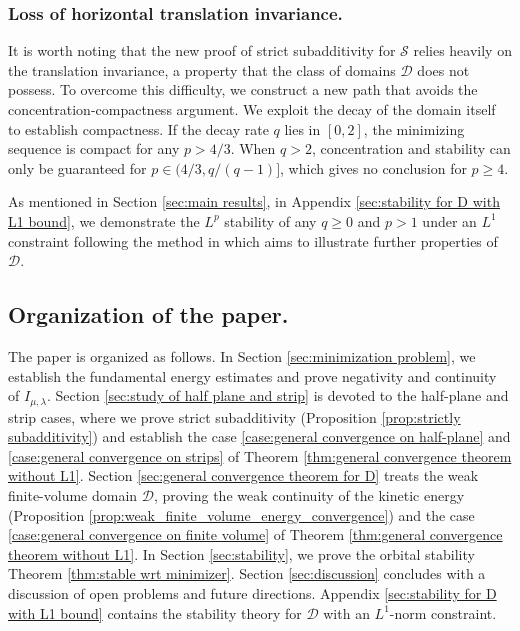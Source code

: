 \documentclass[11pt,letterpaper]{amsart}
\theoremstyle{definition}
\theoremstyle{remark}
\newcommand{\D}{\mathcal{D}}
\renewcommand{\S}{\mathcal{S}}
\numberwithin{equation}{section}
\begin{document}

\subsubsection{Loss of horizontal translation invariance.} 
It is worth noting that the new proof of strict subadditivity for $\S$ relies heavily on the translation invariance, a property that the class of domains $\D$ does not possess. To overcome this difficulty, we construct a new path that avoids the concentration-compactness argument. We exploit the decay of the domain itself to establish compactness. If the decay rate $q$ lies in $[0,2]$, the minimizing sequence is compact for any $p>4/3$. When $q>2$, concentration and stability can only be guaranteed for $p\in (4/3, q/(q-1)]$, which gives no conclusion for $p\geq 4$.

As mentioned in Section \ref{sec:main results}, in Appendix \ref{sec:stability for D with L1 bound}, we demonstrate the $L^p$ stability of any $q \geq 0$ and $p > 1$ under an $L^1$ constraint following the method in \cite{Dong2026StabilityOV} which aims to illustrate further properties of $\D$.


\subsection{Organization of the paper.} The paper is organized as follows. In Section \ref{sec:minimization problem}, we establish the fundamental energy estimates and prove negativity and continuity of $I_{\mu,\lambda}$. Section \ref{sec:study of half plane and strip} is devoted to the half-plane and strip cases, where we prove strict subadditivity (Proposition \ref{prop:strictly subadditivity}) and establish the case \ref{case:general convergence on half-plane} and \ref{case:general convergence on strips} of Theorem \ref{thm:general convergence theorem without L1}. Section \ref{sec:general convergence theorem for D} treats the weak finite-volume domain $\D$, proving the weak continuity of the kinetic energy (Proposition \ref{prop:weak_finite_volume_energy_convergence}) and the case \ref{case:general convergence on finite volume} of Theorem \ref{thm:general convergence theorem without L1}. In Section \ref{sec:stability}, we prove the orbital stability Theorem \ref{thm:stable wrt minimizer}. Section \ref{sec:discussion} concludes with a discussion of open problems and future directions. Appendix \ref{sec:stability for D with L1 bound} contains the stability theory for $\D$ with an 
$L^1$-norm constraint.
\end{document}
